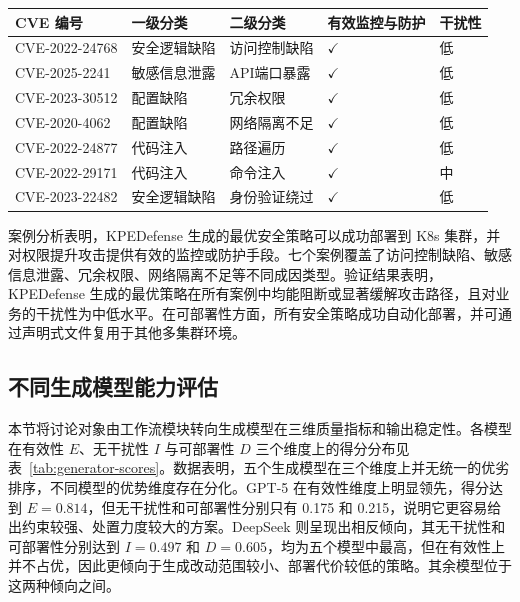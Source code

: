 \begin{table}[htb!]
	\centering
	\label{tab:case-validation-summary}
	\renewcommand{\arraystretch}{1.12}
	\setlength{\tabcolsep}{4pt}
	\small
	\begin{tabularx}{\linewidth}{
	>{\raggedright\arraybackslash}p{2.8cm}
	>{\centering\arraybackslash}p{2.4cm}
	>{\centering\arraybackslash}p{2.4cm}
	>{\centering\arraybackslash}X
	>{\centering\arraybackslash}X}
	\toprule
	\textbf{CVE 编号} &
	\textbf{一级分类} &
	\textbf{二级分类} &
	\textbf{有效监控与防护} &
	\textbf{干扰性} \\
	\midrule

	CVE-2022-24768 & 安全逻辑缺陷 & 访问控制缺陷 & $\checkmark$ & 低 \\
	CVE-2025-2241  & 敏感信息泄露 & API端口暴露   & $\checkmark$ & 低 \\
	CVE-2023-30512 & 配置缺陷     & 冗余权限       & $\checkmark$ & 低 \\
	CVE-2020-4062  & 配置缺陷     & 网络隔离不足   & $\checkmark$ & 低 \\
	CVE-2022-24877 & 代码注入     & 路径遍历       & $\checkmark$ & 低 \\
	CVE-2022-29171 & 代码注入     & 命令注入       & $\checkmark$ & 中 \\
	CVE-2023-22482 & 安全逻辑缺陷 & 身份验证绕过   & $\checkmark$ & 低 \\

	\bottomrule
	\end{tabularx}
\end{table}
案例分析表明，KPEDefense 生成的最优安全策略可以成功部署到 K8s 集群，并对权限提升攻击提供有效的监控或防护手段。七个案例覆盖了访问控制缺陷、敏感信息泄露、冗余权限、网络隔离不足等不同成因类型。验证结果表明，KPEDefense 生成的最优策略在所有案例中均能阻断或显著缓解攻击路径，且对业务的干扰性为中低水平。在可部署性方面，所有安全策略成功自动化部署，并可通过声明式文件复用于其他多集群环境。


\subsection{不同生成模型能力评估}

本节将讨论对象由工作流模块转向生成模型在三维质量指标和输出稳定性。各模型在有效性 $E$、无干扰性 $I$ 与可部署性 $D$ 三个维度上的得分分布见表~\ref{tab:generator-scores}。数据表明，五个生成模型在三个维度上并无统一的优劣排序，不同模型的优势维度存在分化。GPT-5 在有效性维度上明显领先，得分达到 $E=0.814$，但无干扰性和可部署性分别只有 0.175 和 0.215，说明它更容易给出约束较强、处置力度较大的方案。DeepSeek 则呈现出相反倾向，其无干扰性和可部署性分别达到 $I=0.497$ 和 $D=0.605$，均为五个模型中最高，但在有效性上并不占优，因此更倾向于生成改动范围较小、部署代价较低的策略。其余模型位于这两种倾向之间。

